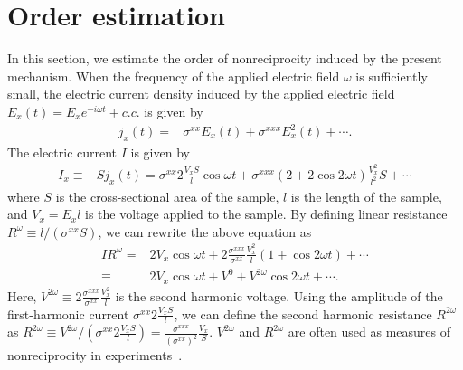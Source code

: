 \documentclass[twocolumn,superscriptaddress]{revtex4-1}
\begin{document}
\section{Order estimation} \label{app:orderEstimation}
In this section, we estimate the order of nonreciprocity induced by the present mechanism.
When the frequency of the applied electric field $\omega$ is sufficiently small, the electric current density induced by the applied electric field $E_x(t)=E_x e^{-i\omega t}+c.c.$ is given by 
\begin{align}
  j_x(t)=&\sigma^{xx} E_x(t)  +\sigma^{xxx} E_x^2(t) +\cdots.
\end{align}
The electric current $I$ is given by
\begin{align}
  I_x\equiv& Sj_x(t)=\sigma^{xx}2\frac{V_x S}{l}\cos\omega t+\sigma^{xxx}(2+2\cos 2\omega t)\frac{V_x^2}{l^2}S+\cdots
\end{align}
where $S$ is the cross-sectional area of the sample, $l$ is the length of the sample, and $V_x=E_x l$ is the voltage applied to the sample.
By defining linear resistance $R^\omega \equiv l/(\sigma^{xx} S)$, we can rewrite the above equation as
\begin{align}
  IR^\omega =& 2V_x \cos\omega t +2\frac{\sigma^{xxx}}{\sigma^{xx}}\frac{V_x^2}{l} (1+\cos 2\omega t)+\cdots \nonumber \\
  \equiv & 2V_x \cos\omega t +V^0 +V^{2\omega} \cos 2\omega t+\cdots.
\end{align}
Here, $V^{2\omega} \equiv 2\frac{\sigma^{xxx}}{\sigma^{xx}}\frac{V_x^2}{l}$ is the second harmonic voltage.
Using the amplitude of the first-harmonic current $\sigma^{xx}2\frac{V_x S}{l}$, we can define the second harmonic resistance $R^{2\omega}$ as $R^{2\omega} \equiv V^{2\omega}/(\sigma^{xx}2\frac{V_x S}{l})=\frac{\sigma^{xxx}}{(\sigma^{xx})^2}\frac{V_x}{S}$.
$V^{2\omega}$ and $R^{2\omega}$ are often used as measures of nonreciprocity in experiments~\cite{Ideue2017,Yokouchi2017,Wakatsuki2017,Yasuda2019,Itahashi2020,Zhang2020,Nakamura2025,Li2021,Wang2022,Wakamura2024}.
\end{document}

